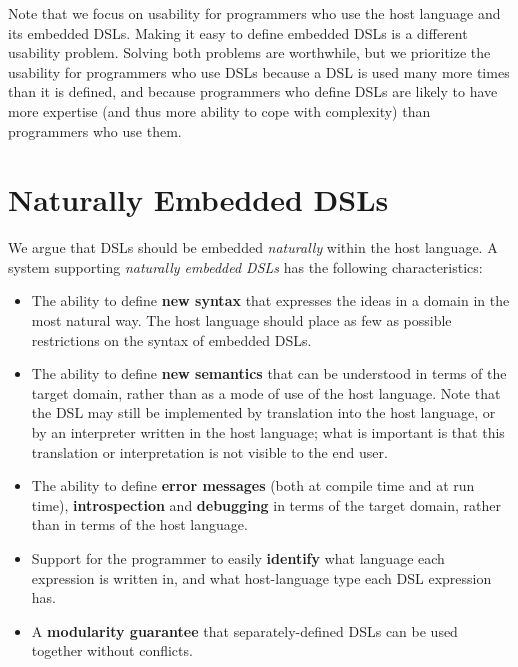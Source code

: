 \documentclass[preprint]{sigplanconf}
\begin{document}
Note that we focus on usability for programmers who use the host
language and its embedded DSLs.  Making it easy to define embedded
DSLs is a different usability problem.  Solving both problems are
worthwhile, but we prioritize the usability for programmers who
use DSLs because a DSL is used many more times than it is defined,
and because programmers who define DSLs are likely to have more
expertise (and thus more ability to cope with complexity) than
programmers who use them.

\section{Naturally Embedded DSLs}

We argue that DSLs should be embedded \textit{naturally} within the
host language.  A system supporting \textit{naturally embedded DSLs}
has the following characteristics:

\begin{itemize}

\item The ability to define \textbf{new syntax} that expresses the ideas
in a domain in the most natural way.  The host language should place as
few as possible restrictions on the syntax of embedded DSLs.


\item The ability to define \textbf{new semantics} that can be understood
in terms of the target domain, rather than as a mode of use of the host
language.  Note that the DSL may still be implemented by translation into
the host language, or by an interpreter written in the host language; what
is important is that this translation or interpretation is not visible to
the end user.

\item The ability to define \textbf{error messages} (both at compile time
and at run time), \textbf{introspection} and \textbf{debugging} in terms
of the target domain, rather than in terms of the host language.

\item Support for the programmer to easily \textbf{identify} what language
each expression is written in, and what host-language type each DSL
expression has.

\item A \textbf{modularity guarantee} that separately-defined DSLs can
be used together without conflicts.

\end{itemize} 
\end{document}
